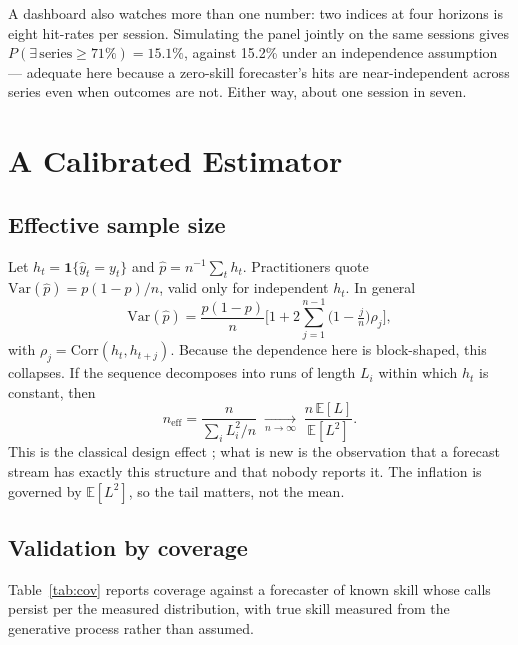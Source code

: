\documentclass[sigconf,nonacm]{acmart}
\begin{document}
A dashboard also watches more than one number: two indices at four horizons is
eight hit-rates per session. Simulating the panel jointly on the same sessions
gives $P(\exists\,\text{series}\geq 71\%) = 15.1\%$, against 15.2\% under an
independence assumption --- adequate here because a zero-skill forecaster's hits
are near-independent across series even when outcomes are not. Either way, about
one session in seven.

\section{A Calibrated Estimator}
\label{sec:est}

\subsection{Effective sample size}

Let $h_t = \mathbf{1}\{\hat{y}_t = y_t\}$ and $\hat{p} = n^{-1}\sum_t h_t$.
Practitioners quote $\mathrm{Var}(\hat{p}) = p(1-p)/n$, valid only for
independent $h_t$. In general
\begin{equation}
\mathrm{Var}(\hat{p}) = \frac{p(1-p)}{n}
\Big[1 + 2\sum_{j=1}^{n-1}\big(1 - \tfrac{j}{n}\big)\rho_j\Big],
\label{eq:var}
\end{equation}
with $\rho_j = \mathrm{Corr}(h_t,h_{t+j})$. Because the dependence here is
block-shaped, this collapses. If the sequence decomposes into runs of length
$L_i$ within which $h_t$ is constant, then
\begin{equation}
n_{\text{eff}} = \frac{n}{\sum_i L_i^2/n}
\;\xrightarrow[n\to\infty]{}\; \frac{n\,\mathbb{E}[L]}{\mathbb{E}[L^2]}.
\label{eq:neff}
\end{equation}
This is the classical design effect \cite{kish1965,moulton1990}; what is new is
the observation that a forecast stream has exactly this structure and that
nobody reports it. The inflation is governed by $\mathbb{E}[L^2]$, so the tail
matters, not the mean.

\subsection{Validation by coverage}

Table~\ref{tab:cov} reports coverage against a forecaster of known skill whose
calls persist per the measured distribution, with true skill measured from the
generative process rather than assumed.
\end{document}
